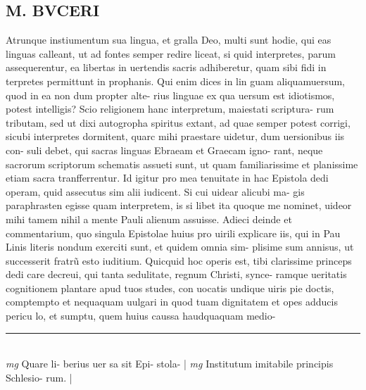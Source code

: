 \documentclass{article}
\begin{document}
\begin{pages}
\section*{M. BVCERI }\pstart Atrunque instiumentum sua lingua, et gralla Deo, multi sunt hodie, qui eas linguas calleant, ut ad fontes semper redire liceat, si quid interpretes, parum assequerentur, ea libertas in uertendis sacris adhiberetur, quam sibi fidi in terpretes permittunt in prophanis. Qui enim dices in lin guam aliquamuersum, quod in ea non dum propter alte- rius linguae ex qua uersum est idiotismos, potest intelligis? Scio religionem hanc interpretum, maiestati scriptura- rum tributam, sed ut dixi autogropha spiritus extant, ad quae semper potest corrigi, sicubi interpretes dormitent, quarc mihi praestare uidetur, dum uersionibus iis con- suli debet, qui sacras linguas Ebraeam et Graecam igno- rant, neque sacrorum scriptorum schematis assueti sunt, ut quam familiarissime et planissime etiam sacra tranfferrentur. Id igitur pro mea tenuitate in hac Epistola dedi operam, quid assecutus sim alii iudicent. Si cui uidear alicubi ma- gis paraphrasten egisse quam interpretem, is si libet ita quoque me nominet, uideor mihi tamem nihil a mente Pauli alienum assuisse. Adieci deinde et commentarium, quo singula Epistolae huius pro uirili explicare iis, qui in Pau Linis literis nondum exerciti sunt, et quidem omnia sim- plisime sum annisus, ut successerit fratrũ esto iuditium.   \pend\pstart Quicquid hoc operis est, tibi clarissime princeps dedi care decreui, qui tanta sedulitate, regnum Christi, synce- ramque ueritatis cognitionem plantare apud tuos studes, con uocatis undique uiris pie doctis, comptempto et nequaquam uulgari in quod tuam dignitatem et opes adducis pericu lo, et sumptu, quem huius caussa haudquaquam medio-  \pend
\vspace{0.5cm}\noindent
\vspace{0.2cm}\rule{1cm}{0.2pt}\\ 
\hspace{0.2cm}\textit{mg}
\footnotesize Quare li- berius uer sa sit Epi- stola- 
\normalsize| 
\hspace{0.2cm}\textit{mg}
\footnotesize Institutum imitabile principis Schlesio- rum.  
\normalsize| 

\end{pages}
\end{document}
